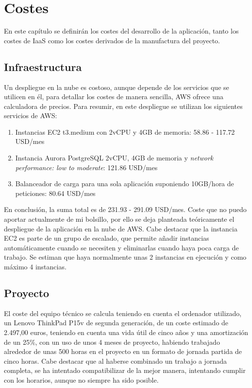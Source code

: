 \chapter{Costes}
En este capítulo se definirán los costes del desarrollo de la aplicación, tanto los costes de IaaS como los costes derivados de la manufactura del proyecto.

\section{Infraestructura}
Un despliegue en la nube es costoso, aunque depende de los servicios que se utilicen en él, para detallar los costes de manera sencilla, AWS ofrece una calculadora de precios. Para resumir, en este despliegue se utilizan los siguientes servicios de AWS:
\begin{enumerate}
    \item Instancias EC2 t3.medium con 2vCPU y 4GB de memoria: 58.86 - 117.72 USD/mes
    \item Instancia Aurora PostgreSQL 2vCPU, 4GB de memoria y \emph{network performance: low to moderate}: 121.86 USD/mes
    \item Balanceador de carga para una sola aplicación suponiendo 10GB/hora de peticiones: 80.64 USD/mes
\end{enumerate}

En conclusión, la suma total es de 231.93 - 291.09 USD/mes. Coste que no puedo aportar actualmente de mi bolsillo, por ello se deja planteada teóricamente el despliegue de la aplicación en la nube de AWS. Cabe destacar que la instancia EC2 es parte de un grupo de escalado, que permite añadir instancias automáticamente cuando se necesiten y eliminarlas cuando haya poca carga de trabajo. Se estiman que haya normalmente unas 2 instancias en ejecución y como máximo 4 instancias.

\section{Proyecto}
El coste del equipo técnico se calcula teniendo en cuenta el ordenador utilizado, un Lenovo ThinkPad P15v de segunda generación, de un coste estimado de 2.497,00 euros, teniendo en cuenta una vida útil de cinco años y una amortización de un 25\%, con un uso de unos 4 meses de proyecto, habiendo trabajado alrededor de unas 500 horas en el proyecto en un formato de jornada partida de cinco horas. Cabe destacar que al haberse combinado un trabajo a jornada completa, se ha intentado compatibilizar de la mejor manera, intentando cumplir con los horarios, aunque no siempre ha sido posible.

